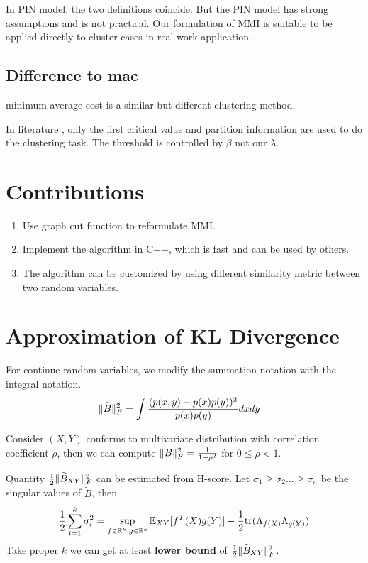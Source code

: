 \documentclass{article}
\newif\ifpublish
\begin{document}
In PIN model, the two definitions coincide. But the PIN model has strong assumptions and is not practical. Our formulation of MMI is suitable to be applied directly to cluster cases in real work application.
\subsection{Difference to mac}
minimum average cost is a similar but different clustering method.

In literature \cite{mac}, only the first critical value and partition information are used to do the clustering task. The threshold is controlled by $\beta$ not our $\lambda$.
\section{Contributions}
\begin{enumerate}
\item Use graph cut function to reformulate MMI.
\item Implement the algorithm in C++, which is fast and can be used by others.
\item The algorithm can be customized by using different similarity metric between two random variables.
\end{enumerate}
\appendix
\section{Approximation of KL Divergence}\label{sec:akld}
\ifpublish

\fi
For continue random variables, we modify the summation notation with the integral notation.
\begin{align}
\lVert\widetilde{B}\rVert_F^2 & = \int \frac{(p(x,y)-p(x)p(y))^2}{p(x)p(y)} dx dy
\end{align}

\begin{example}\label{ex:rho}
Consider $(X,Y)$ conforms to multivariate distribution with correlation coefficient $\rho$, then
we can compute $\lVert B\rVert_F^2 = \frac{1}{1-\rho^2}$ for $0\leq \rho < 1 $.
\end{example}


Quantity ${1 \over 2} \lVert\widetilde{B}_{XY}\rVert_F^2$ can be estimated from H-score.
Let $\sigma_1 \geq \sigma_2 \dots \geq \sigma_n$ be the singular values of  $\widetilde{B}$,
then
\begin{equation}
{1 \over 2} \sum_{i=1}^k \sigma_i^2  = \displaystyle\sup_{f\in \mathbb{R}^k, g \in \mathbb{R}^k} \operatorname{\mathbb{E}}_{XY}[f^T(X)g(Y)]- {1 \over 2} \mathrm{tr}(\Lambda_{f(X)} \Lambda_{g(Y)})
\end{equation}
Take proper $k$ we can get at least \textbf{lower bound} of ${1 \over 2} \lVert\widetilde{B}_{XY}\rVert_F^2$.
\end{document}
